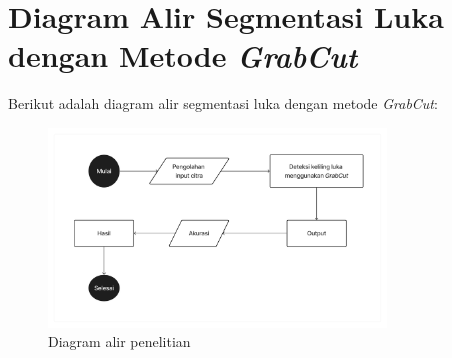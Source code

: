 

\section{Diagram Alir Segmentasi Luka dengan Metode \emph{GrabCut}}
Berikut adalah diagram alir segmentasi luka dengan metode \emph{GrabCut}: 
\begin{figure}[H]
	\centering{}
	\includegraphics[width=0.8\textwidth]{gambar/diagram_penelitian.png}
	\caption{Diagram alir penelitian}
	\label{img:diagram_penelitian}
  \end{figure}

